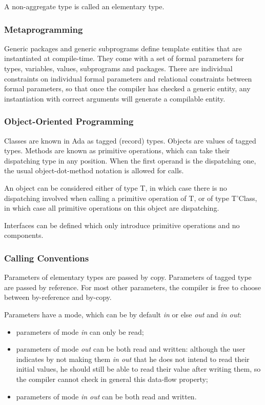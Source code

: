 \documentclass{article}
\begin{document}
A non-aggregate type is called an elementary type.

\subsubsection{Metaprogramming}

Generic packages and generic subprograms define template entities that are
instantiated at compile-time. They come with a set of formal parameters for
types, variables, values, subprograms and packages. There are individual
constraints on individual formal parameters and relational constraints between
formal parameters, so that once the compiler has checked a generic entity, any
instantiation with correct arguments will generate a compilable entity.

\subsubsection{Object-Oriented Programming}

Classes are known in Ada as tagged (record) types. Objects are values of tagged
types. Methods are known as primitive operations, which can take their
dispatching type in any position. When the first operand is the dispatching
one, the usual object-dot-method notation is allowed for calls.

An object can be considered either of type T, in which case there is no
dispatching involved when calling a primitive operation of T, or of type
T'Class, in which case all primitive operations on this object are dispatching.

Interfaces can be defined which only introduce primitive operations and no
components.

\subsubsection{Calling Conventions}

Parameters of elementary types are passed by copy.  Parameters of tagged type
are passed by reference. For most other parameters, the compiler is free to
choose between by-reference and by-copy.

Parameters have a mode, which can be by default \emph{in} or else \emph{out}
and \emph{in out}:
\begin{itemize}
\item parameters of mode \emph{in} can only be read;
\item parameters of mode \emph{out} can be both read and written: although the
  user indicates by not making them \emph{in out} that he does not intend to
  read their initial values, he should still be able to read their value after
  writing them, so the compiler cannot check in general this data-flow
  property;
\item parameters of mode \emph{in out} can be both read and written.
\end{itemize}
\end{document}
